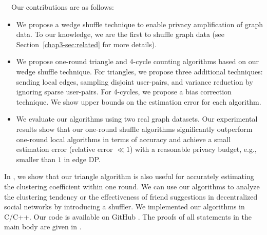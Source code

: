 \smallskip
{}~~Our contributions are as follows: 
\begin{itemize}
    \item We propose a wedge shuffle technique to enable privacy amplification 
    of graph data. 
    To our knowledge, we are the first to shuffle graph data (see Section~\ref{chap3-sec:related} for more details). 
    \item We propose one-round triangle and 4-cycle counting algorithms 
    based on our wedge shuffle technique. 
    For triangles, we propose three additional techniques: sending local edges, sampling disjoint user-pairs, and variance reduction by ignoring sparse user-pairs. 
    For 4-cycles, we propose a bias correction technique. 
    We show upper bounds on the estimation error for each algorithm. 
    \item We evaluate our algorithms using two real graph datasets. 
    Our experimental results show that our one-round shuffle algorithms 
    significantly outperform one-round local algorithms in terms of accuracy 
    and achieve a small estimation error (relative error $\ll 1$) with a reasonable privacy budget, e.g., smaller than $1$ in edge DP. 
\end{itemize}
In , we show that our triangle algorithm is also useful for accurately estimating the clustering coefficient within one round. 
We can use our algorithms to analyze the clustering tendency or the effectiveness of friend suggestions in decentralized social networks by introducing a shuffler. 
We implemented our algorithms in C/C++. 
Our code is available on GitHub \cite{SubgraphShuffle}. 
The proofs of all statements in the main body are given in . 

